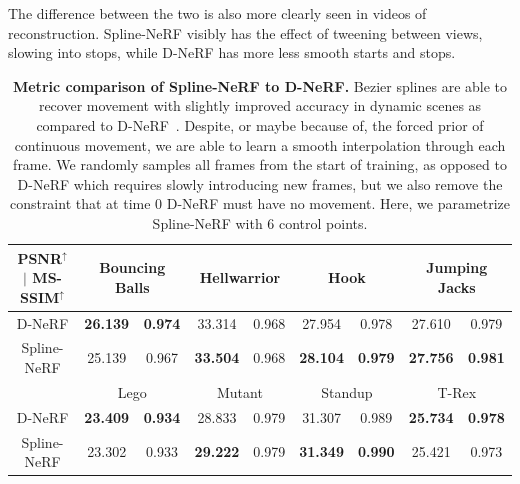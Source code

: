 The difference between the two is also more clearly seen in videos of reconstruction. Spline-NeRF visibly has the effect of tweening between views, slowing into stops, while D-NeRF has more less smooth starts and stops.

\begin{table}[t]
    \centering
    \begin{tabular}{|c| c|c | c|c | c|c | c|c |}
    \hline
    \textbf{PSNR$^\uparrow$ $|$ MS-SSIM$^\uparrow$} & \multicolumn{2}{c|}{Bouncing Balls} & \multicolumn{2}{c|}{Hellwarrior} & \multicolumn{2}{c|}{Hook} & \multicolumn{2}{c|}{Jumping Jacks} \\
    \hline
    D-NeRF & \textbf{26.139} & \textbf{0.974}
           & 33.314 & 0.968
           & 27.954 & 0.978
           & 27.610 & 0.979 \\
    \hline
    Spline-NeRF & 25.139 & 0.967
               & \textbf{33.504} & 0.968
               & \textbf{28.104} & \textbf{0.979}
               & \textbf{27.756} & \textbf{0.981} \\
    \hline
    & \multicolumn{2}{c|}{Lego} & \multicolumn{2}{c|}{Mutant} & \multicolumn{2}{c|}{Standup} & \multicolumn{2}{c|}{T-Rex} \\
    \hline
    D-NeRF & \textbf{23.409} & \textbf{0.934}
           & 28.833 & 0.979
           & 31.307 & 0.989
           & \textbf{25.734} & \textbf{0.978} \\
    \hline
    Spline-NeRF & 23.302 & 0.933
               & \textbf{29.222} & 0.979
               & \textbf{31.349} & \textbf{0.990}
               & 25.421 & 0.973 \\
    \hline
    \end{tabular}
    \vspace{3pt}
    \caption{
        \textbf{Metric comparison of Spline-NeRF to D-NeRF.}
        Bezier splines are able to recover movement with slightly improved accuracy in dynamic scenes as compared to D-NeRF~\cite{pumarola2020dnerf}. Despite, or maybe because of, the forced prior of continuous movement, we are able to learn a smooth interpolation through each frame. We randomly samples all frames from the start of training, as opposed to D-NeRF which requires slowly introducing new frames, but we also remove the constraint that at time 0 D-NeRF must have no movement. Here, we parametrize Spline-NeRF with 6 control points.
    }
\end{table}

